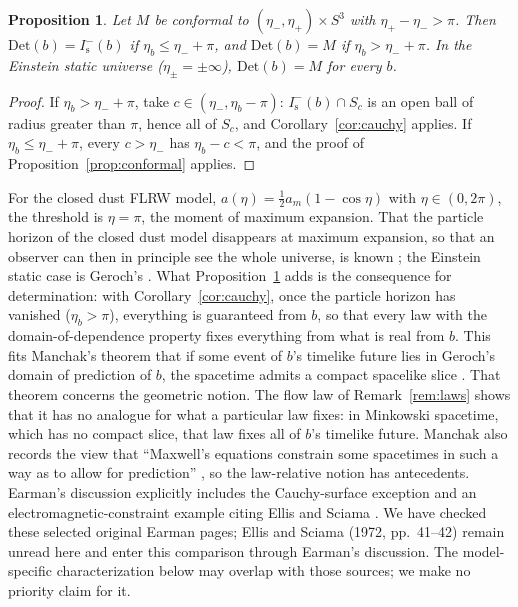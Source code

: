 \documentclass[11pt]{article}
\newtheorem{proposition}[theorem]{Proposition}
\theoremstyle{definition}
\newcommand{\Is}{I^-_{\mathrm s}}
\newcommand{\Det}{\mathrm{Det}}
\begin{document}
\begin{proposition}\label{prop:dust}
Let $M$ be conformal to $(\eta_-,\eta_+)\times S^3$ with $\eta_+-\eta_->\pi$.
Then $\Det(b)=\Is(b)$ if $\eta_b\le\eta_-+\pi$, and $\Det(b)=M$ if
$\eta_b>\eta_-+\pi$. In the Einstein static universe ($\eta_\pm=\pm\infty$),
$\Det(b)=M$ for every $b$.
\end{proposition}

\begin{proof}
If $\eta_b>\eta_-+\pi$, take $c\in(\eta_-,\eta_b-\pi)$: $\Is(b)\cap S_c$ is an open
ball of radius greater than $\pi$, hence all of $S_c$, and
Corollary~\ref{cor:cauchy} applies. If $\eta_b\le\eta_-+\pi$, every $c>\eta_-$
has $\eta_b-c<\pi$, and the proof of Proposition~\ref{prop:conformal} applies.
\end{proof}

For the closed dust FLRW model, $a(\eta)=\tfrac12a_m(1-\cos\eta)$ with
$\eta\in(0,2\pi)$, the threshold is $\eta=\pi$, the moment of maximum
expansion. That the particle horizon of the closed dust model disappears at
maximum expansion, so that an observer can then in principle see the whole
universe, is known \citep{GronJohannesen2011,BolotinTanatarov2013}; the
Einstein static case is Geroch's \citep[Fig.~5]{Geroch1977}. What
Proposition~\ref{prop:dust} adds is the consequence for determination: with
Corollary~\ref{cor:cauchy}, once the particle horizon has vanished
($\eta_b>\pi$), everything is guaranteed from $b$, so that every law with the
domain-of-dependence property fixes everything from what is real from $b$.
This fits Manchak's theorem that if some event of $b$'s timelike future lies
in Geroch's domain of prediction of $b$, the spacetime admits a compact
spacelike slice \citep[p.~319]{Manchak2008}. That theorem concerns the
geometric notion. The flow law of Remark~\ref{rem:laws} shows that it has no
analogue for what a particular law fixes: in Minkowski spacetime, which has no
compact slice, that law fixes all of $b$'s timelike future. Manchak also
records the view that ``Maxwell's equations constrain some spacetimes in such
a way as to allow for prediction'' \citep[p.~321 and n.~15]{Manchak2008}, so
the law-relative notion has antecedents. Earman's discussion explicitly
includes the Cauchy-surface exception and an electromagnetic-constraint
example citing Ellis and Sciama \citep[pp.~125--130]{Earman1995}. We have checked
these selected original Earman pages; Ellis and Sciama (1972, pp.~41--42)
remain unread here and enter this comparison through Earman's discussion.
The model-specific characterization below may overlap with those sources;
we make no priority claim for it.
\end{document}
